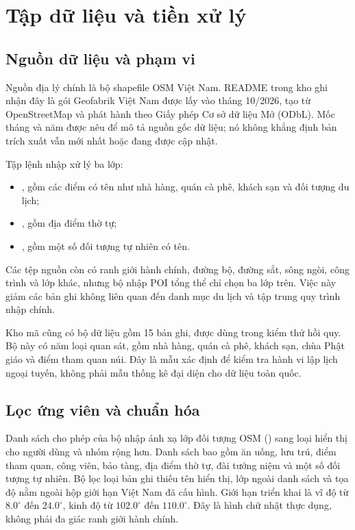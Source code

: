 \chapter{Tập dữ liệu và tiền xử lý}
\label{chap:dataset}

\section{Nguồn dữ liệu và phạm vi}

Nguồn địa lý chính là bộ shapefile OSM Việt Nam. README trong kho ghi nhận đây là gói Geofabrik Việt Nam được lấy vào tháng 10/2026, tạo từ OpenStreetMap và phát hành theo Giấy phép Cơ sở dữ liệu Mở (ODbL). Mốc tháng và năm được nêu để mô tả nguồn gốc dữ liệu; nó không khẳng định bản trích xuất vẫn mới nhất hoặc đang được cập nhật.

Tập lệnh nhập  xử lý ba lớp:
\begin{itemize}[leftmargin=1.8em,itemsep=3pt]
    \item {}, gồm các điểm có tên như nhà hàng, quán cà phê, khách sạn và đối tượng du lịch;
    \item {}, gồm địa điểm thờ tự;
    \item {}, gồm một số đối tượng tự nhiên có tên.
\end{itemize}
Các tệp nguồn còn có ranh giới hành chính, đường bộ, đường sắt, sông ngòi, công trình và lớp khác, nhưng bộ nhập POI tổng thể chỉ chọn ba lớp trên. Việc này giảm các bản ghi không liên quan đến danh mục du lịch và tập trung quy trình nhập chính.

Kho mã cũng có bộ dữ liệu  gồm 15 bản ghi, được dùng trong kiểm thử hồi quy. Bộ này có năm loại quan sát, gồm nhà hàng, quán cà phê, khách sạn, chùa Phật giáo và điểm tham quan núi. Đây là mẫu xác định để kiểm tra hành vi lập lịch ngoại tuyến, không phải mẫu thống kê đại diện cho dữ liệu toàn quốc.

\section{Lọc ứng viên và chuẩn hóa}

Danh sách cho phép của bộ nhập ánh xạ lớp đối tượng OSM () sang loại hiển thị cho người dùng và nhóm rộng hơn. Danh sách bao gồm ăn uống, lưu trú, điểm tham quan, công viên, bảo tàng, địa điểm thờ tự, đài tưởng niệm và một số đối tượng tự nhiên. Bộ lọc loại bản ghi thiếu tên hiển thị, lớp ngoài danh sách và tọa độ nằm ngoài hộp giới hạn Việt Nam đã cấu hình. Giới hạn triển khai là vĩ độ từ $8.0^\circ$ đến $24.0^\circ$, kinh độ từ $102.0^\circ$ đến $110.0^\circ$. Đây là hình chữ nhật thực dụng, không phải đa giác ranh giới hành chính.

